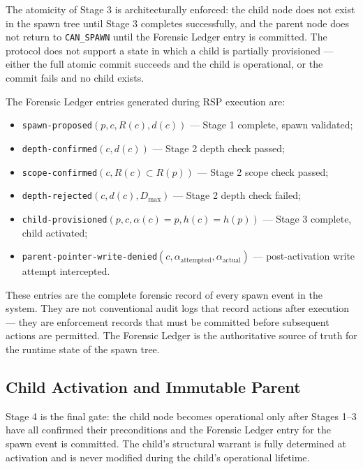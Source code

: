 The atomicity of Stage 3 is architecturally enforced: the child node does not exist in the spawn tree until Stage 3 completes successfully, and the parent node does not return to \texttt{CAN\_SPAWN} until the Forensic Ledger entry is committed. The protocol does not support a state in which a child is partially provisioned — either the full atomic commit succeeds and the child is operational, or the commit fails and no child exists.

The Forensic Ledger entries generated during RSP execution are:

\begin{itemize}\itemsep=0pt
\item \texttt{spawn-proposed}$(p, c, R(c), d(c))$ — Stage 1 complete, spawn validated;
\item \texttt{depth-confirmed}$(c, d(c))$ — Stage 2 depth check passed;
\item \texttt{scope-confirmed}$(c, R(c) \subset R(p))$ — Stage 2 scope check passed;
\item \texttt{depth-rejected}$(c, d(c), D_{\max})$ — Stage 2 depth check failed;
\item \texttt{child-provisioned}$(p, c, \alpha(c) = p, h(c) = h(p))$ — Stage 3 complete, child activated;
\item \texttt{parent-pointer-write-denied}$(c, \alpha_{\text{attempted}}, \alpha_{\text{actual}})$ — post-activation write attempt intercepted.
\end{itemize}

These entries are the complete forensic record of every spawn event in the system. They are not conventional audit logs that record actions after execution — they are enforcement records that must be committed before subsequent actions are permitted. The Forensic Ledger is the authoritative source of truth for the runtime state of the spawn tree.

\subsection{Child Activation and Immutable Parent}
\label{sec:rsp-child-activation}

Stage 4 is the final gate: the child node becomes operational only after Stages 1–3 have all confirmed their preconditions and the Forensic Ledger entry for the spawn event is committed. The child's structural warrant is fully determined at activation and is never modified during the child's operational lifetime.

